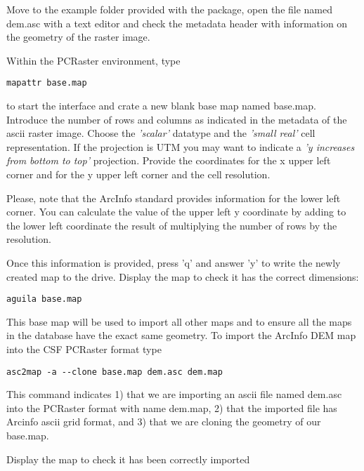 Move to the example folder provided with the \echo package, open the file named \textsf{dem.asc} with a text editor and check the metadata header with information on the geometry of the raster image.

Within the PCRaster environment, type 

\begin{verbatim}
mapattr base.map
\end{verbatim}

to start the interface and crate a new blank base map named \textsf{base.map}. Introduce the number of rows and columns as indicated in the metadata of the ascii raster image. Choose the \textit{'scalar'} datatype and the \textit{'small real'} cell representation. If the projection is UTM you may want to indicate a \textit{'y increases from bottom to top'} projection. Provide the coordinates for the x upper left corner and for the y upper left corner and the cell resolution.
 
 \medskip 
\begin{Frame}
Please, note that the ArcInfo standard provides information for the lower left corner. You can calculate the value of the upper left y coordinate by adding to the lower left coordinate the result of multiplying the number of rows by the resolution.
\end{Frame}
 \medskip
 
Once this information is provided, press 'q' and answer 'y' to write the newly created map to the drive. Display the map to check it has the correct dimensions:

\begin{verbatim}
aguila base.map
\end{verbatim}
 
This base map will be used to import all other maps and to ensure all the maps in the database have the exact same geometry. To import the ArcInfo DEM map into the CSF PCRaster format type

\begin{verbatim}
asc2map -a --clone base.map dem.asc dem.map
\end{verbatim}

This command indicates 1) that we are importing an ascii file named \textsf{dem.asc} into the PCRaster format with name \textsf{dem.map}, 2) that the imported file has Arcinfo ascii grid format, and 3) that we are cloning the geometry of our base.map. 

Display the map to check it has been correctly imported

